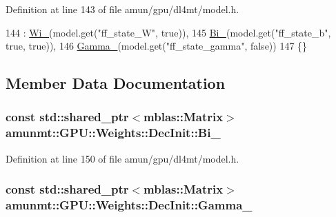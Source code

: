 Definition at line 143 of file amun/gpu/dl4mt/model.\+h.


\begin{DoxyCode}
144     : \hyperlink{structamunmt_1_1GPU_1_1Weights_1_1DecInit_a5b347c65f13d8b61168770d2a3cfd439}{Wi\_}(model.get(\textcolor{stringliteral}{"ff\_state\_W"}, \textcolor{keyword}{true})),
145       \hyperlink{structamunmt_1_1GPU_1_1Weights_1_1DecInit_a65840111f29600e8d27d794e2ba652f3}{Bi\_}(model.get(\textcolor{stringliteral}{"ff\_state\_b"}, \textcolor{keyword}{true}, \textcolor{keyword}{true})),
146       \hyperlink{structamunmt_1_1GPU_1_1Weights_1_1DecInit_a517c78e4b2646a5c9699c157d7769c4f}{Gamma\_}(model.get(\textcolor{stringliteral}{"ff\_state\_gamma"}, \textcolor{keyword}{false}))
147     \{\}
\end{DoxyCode}


\subsection{Member Data Documentation}
\subsubsection[{\texorpdfstring{Bi\+\_\+}{Bi_}}]{\setlength{\rightskip}{0pt plus 5cm}const std\+::shared\+\_\+ptr$<${\bf mblas\+::\+Matrix}$>$ amunmt\+::\+G\+P\+U\+::\+Weights\+::\+Dec\+Init\+::\+Bi\+\_\+}\hypertarget{structamunmt_1_1GPU_1_1Weights_1_1DecInit_a65840111f29600e8d27d794e2ba652f3}{}\label{structamunmt_1_1GPU_1_1Weights_1_1DecInit_a65840111f29600e8d27d794e2ba652f3}


Definition at line 150 of file amun/gpu/dl4mt/model.\+h.

\subsubsection[{\texorpdfstring{Gamma\+\_\+}{Gamma_}}]{\setlength{\rightskip}{0pt plus 5cm}const std\+::shared\+\_\+ptr$<${\bf mblas\+::\+Matrix}$>$ amunmt\+::\+G\+P\+U\+::\+Weights\+::\+Dec\+Init\+::\+Gamma\+\_\+}\hypertarget{structamunmt_1_1GPU_1_1Weights_1_1DecInit_a517c78e4b2646a5c9699c157d7769c4f}{}\label{structamunmt_1_1GPU_1_1Weights_1_1DecInit_a517c78e4b2646a5c9699c157d7769c4f}


